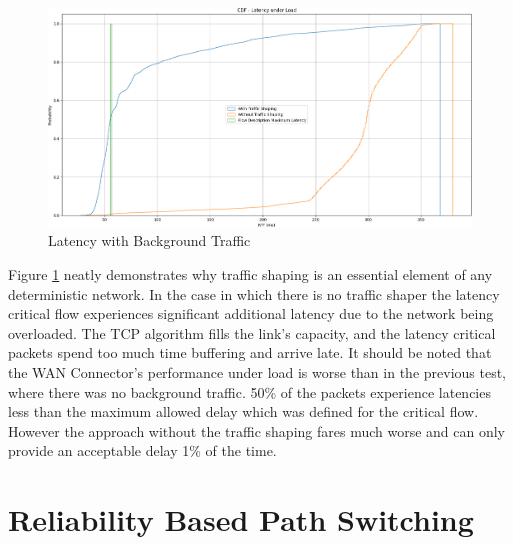 \begin{figure}[h]
    \centering
        \includegraphics[height=0.66\textwidth,width=\textwidth]{fig/rrul_cdf.png}
        \caption{Latency with Background Traffic}
        \label{fig:rrul_cdf}
\end{figure}

Figure \ref{fig:rrul_cdf} neatly demonstrates why traffic shaping is an essential element of any deterministic network. In the case in which there is no traffic shaper the latency critical flow experiences significant additional latency due to the network being overloaded. The TCP algorithm fills the link's capacity, and the latency critical packets spend too much time buffering and arrive late. It should be noted that the WAN Connector's performance under load is worse than in the previous test, where there was no background traffic. 50\% of the packets experience latencies less than the maximum allowed delay which was defined for the critical flow. However the approach without the traffic shaping fares much worse and can only provide an acceptable delay 1\% of the time.

\section{Reliability Based Path Switching}

